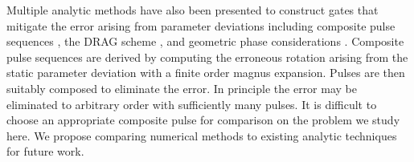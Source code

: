 Multiple analytic methods have also been presented to construct gates
that mitigate the error arising from parameter deviations
including composite pulse sequences \cite{merrill2014progress},
the DRAG scheme \cite{krantz2019quantum}, and
geometric phase considerations
\cite{xu2020nonadiabatic, han2020experimental}.
Composite pulse sequences are derived by computing
the erroneous rotation arising from the static parameter deviation
with a finite order magnus expansion.
Pulses are then suitably composed to eliminate the
error. In principle the error may be eliminated
to arbitrary order with sufficiently many pulses.
It is difficult to choose an appropriate composite pulse
for comparison on the problem we study here. We
propose comparing numerical methods to existing analytic
techniques for future work.
